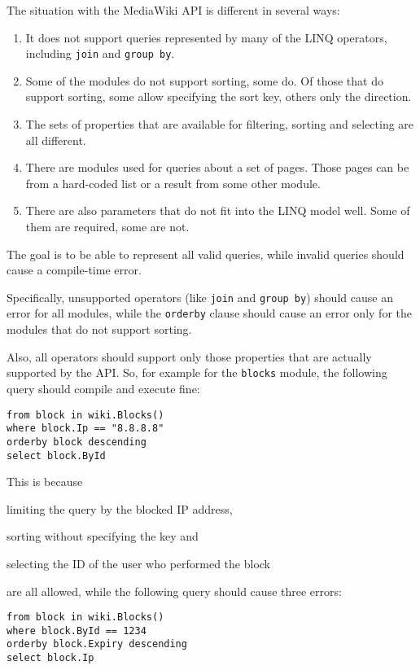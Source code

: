 The situation with the MediaWiki \ac{API} is different in several ways:

\begin{enumerate}
\item It does not support queries represented by many of the LINQ operators, including \lstinline{join} and \lstinline{group by}.
\item Some of the modules do not support sorting, some do. Of those that do support sorting, some allow specifying the sort key, others only the direction.
\item The sets of properties that are available for filtering, sorting and selecting are all different.
\item There are modules used for queries about a set of pages. Those pages can be from a hard-coded list or a result from some other module.
\item There are also parameters that do not fit into the LINQ model well. Some of them are required, some are not.
\end{enumerate}

The goal is to be able to represent all valid queries, while invalid queries should cause a compile-time error.

Specifically, unsupported operators (like \lstinline{join} and \lstinline{group by}) should cause an error for all modules,
while the \lstinline{orderby} clause should cause an error only for the modules that do not support sorting.

Also, all operators should support only those properties that are actually supported by the \ac{API}.
So, for example for the \verb,blocks, module, the following query should compile and execute fine:

\begin{lstlisting}
from block in wiki.Blocks()
where block.Ip == "8.8.8.8"
orderby block descending
select block.ById
\end{lstlisting}

This is because
\begin{compactitem}
\item limiting the query by the blocked \ac{IP} address,
\item sorting without specifying the key and
\item selecting the ID of the user who performed the block
\end{compactitem}
are all allowed, while the following query should cause three errors:

\begin{lstlisting}
from block in wiki.Blocks()
where block.ById == 1234
orderby block.Expiry descending
select block.Ip
\end{lstlisting}

